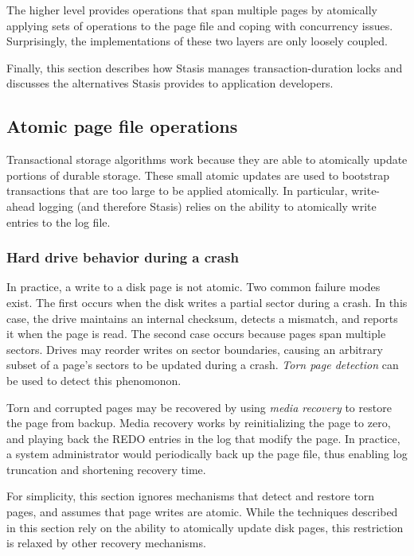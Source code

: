 \documentclass[letterpaper,twocolumn,10pt]{article}
\newcommand{\yad}{Stasis\xspace}
\begin{document}
The higher level provides operations that span multiple pages by
atomically applying sets of operations to the page file and coping
with concurrency issues.  Surprisingly, the implementations of these
two layers are only loosely coupled.

Finally, this section describes how \yad manages transaction-duration
locks and discusses the alternatives \yad provides to application developers.

\subsection{Atomic page file operations}

Transactional storage algorithms work because they are able to
atomically update portions of durable storage.  These small atomic
updates are used to bootstrap transactions that are too large to be
applied atomically.  In particular, write-ahead logging (and therefore
\yad) relies on the ability to atomically write entries to the log
file.

\subsubsection{Hard drive behavior during a crash}
In practice, a write to a disk page is not atomic.  Two common failure
modes exist.  The first occurs when the disk writes a partial sector
during a crash.  In this case, the drive maintains an internal
checksum, detects a mismatch, and reports it when the page is read.
The second case occurs because pages span multiple sectors.  Drives
may reorder writes on sector boundaries, causing an arbitrary subset
of a page's sectors to be updated during a crash.  {\em Torn page
detection} can be used to detect this phenomonon.

Torn
and corrupted pages may be recovered by using {\em media recovery} to
restore the page from backup.  Media recovery works by reinitializing
the page to zero, and playing back the REDO entries in the log that
modify the page.  In practice, a system administrator would
periodically back up the page file, thus enabling log truncation and
shortening recovery time.

For simplicity, this section ignores mechanisms that detect
and restore torn pages, and assumes that page writes are atomic.
While the techniques described in this section rely on the ability to
atomically update disk pages, this restriction is relaxed by other 
recovery mechanisms.
\end{document}
